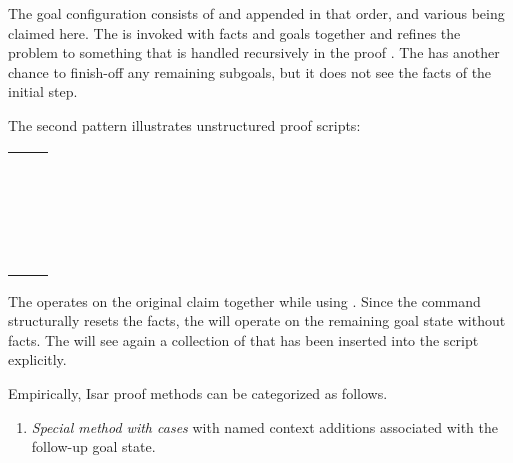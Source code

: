 \begin{isabellebody}
\begin{isamarkuptext}
  The goal configuration consists of  and  appended in that order, and various  being
  claimed here.  The  is invoked with facts
  and goals together and refines the problem to something that is
  handled recursively in the proof .  The  has another chance to finish-off any remaining
  subgoals, but it does not see the facts of the initial step.

  \medskip The second pattern illustrates unstructured proof scripts:

  \medskip
  \begin{tabular}{l}
  \hyperlink{command.have}{\mbox{\isa{\isacommand{have}}}}~\isa{props} \\
  \quad\hyperlink{command.using}{\mbox{\isa{\isacommand{using}}}}~\isa{facts\isactrlsub {\isadigit{1}}}~\hyperlink{command.apply}{\mbox{\isa{\isacommand{apply}}}}~\isa{method\isactrlsub {\isadigit{1}}} \\
  \quad\hyperlink{command.apply}{\mbox{\isa{\isacommand{apply}}}}~\isa{method\isactrlsub {\isadigit{2}}} \\
  \quad\hyperlink{command.using}{\mbox{\isa{\isacommand{using}}}}~\isa{facts\isactrlsub {\isadigit{3}}}~\hyperlink{command.apply}{\mbox{\isa{\isacommand{apply}}}}~\isa{method\isactrlsub {\isadigit{3}}} \\
  \quad\hyperlink{command.done}{\mbox{\isa{\isacommand{done}}}} \\
  \end{tabular}
  \medskip

  The  operates on the original claim together while
  using .  Since the \hyperlink{command.apply}{\mbox{}} command
  structurally resets the facts, the  will operate on
  the remaining goal state without facts.  The  will
  see again a collection of  that has been inserted
  into the script explicitly.

  \medskip Empirically, Isar proof methods can be categorized as
  follows.

  \begin{enumerate}

  \item \emph{Special method with cases} with named context additions
  associated with the follow-up goal state.


\end{enumerate}
\end{isamarkuptext}
\end{isabellebody}
